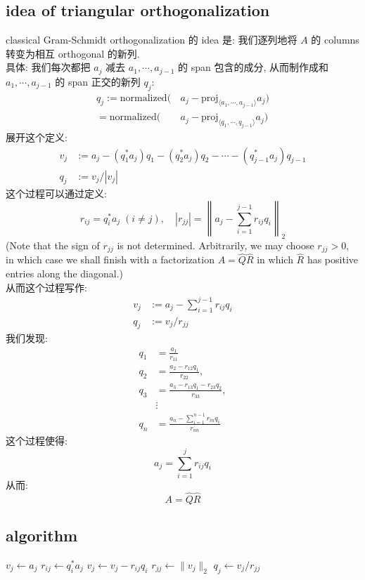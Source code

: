 \documentclass[lang=cn,11pt]{elegantbook}
\begin{document}
\subsection{idea of triangular orthogonalization}
classical Gram-Schmidt orthogonalization 的 idea 是: 我们逐列地将 $A$ 的 columns 转变为相互 orthogonal 的新列.\\
具体: 我们每次都把 $a_j$ 减去 $a_1,\cdots, a_{j-1}$ 的 span 包含的成分, 从而制作成和  $a_1,\cdots, a_{j-1}$ 的 span 正交的新列 $q_j$: 
\begin{align*}
q_j := \text{normalized} (& \,a_j - \text{proj}_ {\langle a_1,\cdots,a_{j-1} \rangle} a_j) \\
=  \text{normalized} (& \,a_j- \text{proj}_ {\langle q_1,\cdots,q_{j-1} \rangle} a_j)
\end{align*}
展开这个定义: 
\begin{align*}
v_j&:=a_j-\left(q_1^* a_j\right) q_1-\left(q_2^* a_j\right) q_2-\cdots-\left(q_{j-1}^* a_j\right) q_{j-1}\\
    q_j  &:= v_j / |v_j|  
\end{align*}
这个过程可以通过定义: 
$$
r_{i j}=q_i^* a_j \;(i \neq j), \quad   \left|r_{j j}\right|=\left\|a_j-\sum_{i=1}^{j-1} r_{i j} q_i\right\|_2
$$
(Note that the sign of $r_{j j}$ is not determined. Arbitrarily, we may choose $r_{j j}>0$, in which case we shall finish with a factorization $A=\hat{Q} \hat{R}$ in which $\hat{R}$ has positive entries along the diagonal.)\\
从而这个过程写作: 
\begin{align*}
v_j &:=a_j -  \sum_{i=1}^{j-1} r_{i j} q_i    \\
q_j  &:= v_j / r_{jj}  
\end{align*}
我们发现:
$$
\begin{aligned}
q_1 & =\frac{a_1}{r_{11}} \\
q_2 & =\frac{a_2-r_{12} q_1}{r_{22}}, \\
q_3 & =\frac{a_3-r_{13} q_1-r_{23} q_2}{r_{33}}, \\
& \vdots \\
q_n & =\frac{a_n-\sum_{i=1}^{n-1} r_{i n} q_i}{r_{n n}}
\end{aligned}
$$
这个过程使得: 
\[
a_j = \sum_{i=1}^j r_{ij} q_i
\]从而:
\[
A  = \hat{Q} \hat{R}
\]

\subsection{algorithm}


\begin{algorithm}
\caption{Classical Gram-Schmidt (unstable)}
\begin{algorithmic}[1]
    \STATE $v_j \gets a_j$
        \STATE $r_{ij} \gets q_i^* a_j$
        \STATE $v_j \gets v_j - r_{ij} q_i$
    \ENDFOR
    \STATE $r_{jj} \gets \|v_j\|_2$
    \STATE $q_j \gets v_j / r_{jj}$
\ENDFOR
\end{algorithmic}
\end{algorithm}
\end{document}
